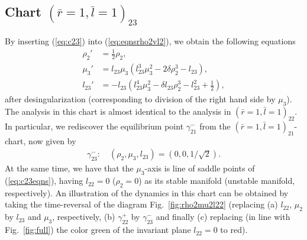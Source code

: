 \documentclass[reqno,12pt]{amsart}
\newcommand{\eqlab}[1]{\label{eq:#1}}
\renewcommand{\eqref}[1]{(\ref{eq:#1})}
\newcommand{\figref}[1]{Fig.~\ref{fig:#1}}
\numberwithin{equation}{section}
\begin{document}
\subsection{Chart $(\bar r=1,\bar l=1)_{23}$}
By inserting \eqref{c23} into \eqref{eqnsrho2vl2}, we obtain the following equations
\begin{equation}\eqlab{c23eqns}
\begin{aligned}
 \rho_2' &=\frac12 \rho_2,\\
  \mu_3' &=l_{23} \mu_3\left(l_{23}^3 \mu_3^2-2\delta \rho_2^3 - l_{23}\right),\\
  l_{23}'&=-l_{23}\left(l_{23}^4 \mu_3^2-\delta l_{23}\rho_2^3 -l_{23}^2 + \frac12\right),
\end{aligned}
\end{equation}
after desingularization (corresponding to division of the right hand side by $\mu_3$).
The analysis in this chart is almost identical to the analysis in $(\bar r=1,\bar l=1)_{22}$. In particular, we rediscover the equilibrium point $\gamma^-_{21}$ from the $(\bar r=1,\bar l=1)_{21}$-chart, now given by
\begin{align*}
 \gamma_{23}^-:\quad (\rho_2,\mu_3,l_{23})=(0,0,1/\sqrt{2}).
\end{align*}
At the same time, we have that the $\mu_3$-axis is line of saddle points of \eqref{c23eqns}, having $l_{22}=0$ ($\rho_2=0$) as its stable manifold (unstable manifold, respectively). An illustration of the dynamics in this chart can be obtained by taking the time-reversal of the diagram \figref{rho2mu2l22} (replacing (a) $l_{22}$, $\mu_2$ by $l_{23}$ and $\mu_3$, respectively,  (b) $\gamma_{22}^+$ by $\gamma_{23}^-$ and finally (c) replacing (in line with \figref{full}) the color green of the invariant plane $l_{22}=0$ to red).

\end{document}
